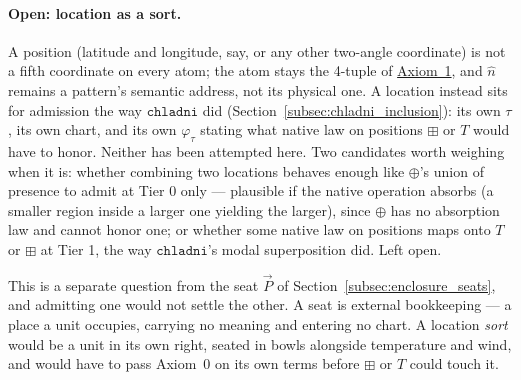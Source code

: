 \documentclass[12pt, a4paper]{article}
\begin{document}
\paragraph{Open: location as a sort.} A position (latitude and
longitude, say, or any other two-angle coordinate) is not a fifth
coordinate on every atom; the atom stays the 4-tuple of
\hyperref[subsec:axiom1]{Axiom~1}, and $\hat n$ remains a pattern's semantic
address, not its physical one. A location instead sits for admission
the way $\mathtt{chladni}$ did
(Section~\ref{subsec:chladni_inclusion}): its own $\tau$, its own
chart, and its own $\varphi_\tau$ stating what native law on positions
$\boxplus$ or $T$ would have to honor. Neither has been attempted
here. Two candidates worth weighing when it is: whether combining two
locations behaves enough like $\oplus$'s union of presence to admit at
Tier 0 only --- plausible if the native operation absorbs (a smaller
region inside a larger one yielding the larger), since $\oplus$ has no
absorption law and cannot honor one; or whether some native law on
positions maps onto $T$ or $\boxplus$ at Tier 1, the way
$\mathtt{chladni}$'s modal superposition did. Left open.

This is a separate question from the seat $\vec P$ of
Section~\ref{subsec:enclosure_seats}, and admitting one would not
settle the other. A seat is external bookkeeping --- a place a unit
occupies, carrying no meaning and entering no chart. A location
\emph{sort} would be a unit in its own right, seated in bowls
alongside temperature and wind, and would have to pass Axiom~0 on its
own terms before $\boxplus$ or $T$ could touch it.
\end{document}

